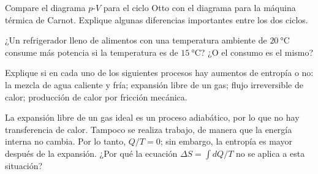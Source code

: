 %
\begin{Exercise}
  {}{}
  Compare el diagrama $p$-$V$ para el ciclo Otto con el diagrama para la máquina térmica de Carnot. Explique algunas diferencias importantes entre los dos ciclos.
\end{Exercise}
%
\begin{Exercise}
  ¿Un refrigerador lleno de alimentos con una temperatura ambiente de $\SI{20}{\celsius}$ consume más potencia si la temperatura es de $\SI{15}{\celsius}$? ¿O el consumo es el mismo?
\end{Exercise}
%
\begin{Exercise}
  Explique si en cada uno de los siguientes procesos hay aumentos de entropía o no: la mezcla de agua caliente y fría; expansión libre de un gas; flujo irreversible de calor; producción de calor por fricción mecánica.
\end{Exercise}
%
\begin{Exercise}
  La expansión libre de un gas ideal es un proceso adiabático, por lo que no hay transferencia de calor. Tampoco se realiza trabajo, de manera que la energía interna no cambia. Por lo tanto, $Q/T = 0$; sin embargo, la entropía es mayor después de la expansión. ¿Por qué la ecuación $\Delta S = \int dQ/T$ no se aplica a esta situación?
\end{Exercise}
%
